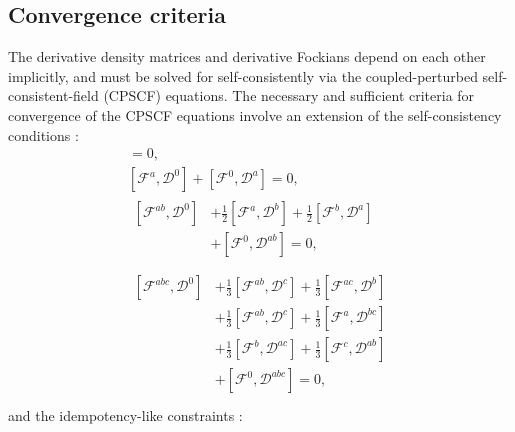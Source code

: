 \documentclass[prl,aps,letterpaper,twocolumn,showpacs,twocolumngrid,superbib]{revtex4}
\def\F{\mathcal{F}}
\def\D{\mathcal{D}}
\begin{document}
\subsection{Convergence criteria}

The derivative density matrices and derivative Fockians depend on 
each other implicitly, and must be solved for self-consistently
via the coupled-perturbed self-consistent-field (CPSCF) equations.
The necessary and sufficient criteria for convergence of the 
CPSCF equations involve an extension of the self-consistency conditions \cite{Furche_2001}:
\begin{gather}
    [\F^{0} ,\D^{0}]=0,\label{eq:commutators1}\\
    [\F^{a} ,\D^{0}]+[\F^{0},\D^{a}]=0,\label{eq:commutators2}\\
  \begin{split}
    [\F^{ab},\D^{0}]&+\frac{1}{2}[\F^{a},\D^{b}]+\frac{1}{2}[\F^{b},\D^{a}] \\
    &+[\F^{0},\D^{ab}]=0,\label{eq:commutators3}\\
  \end{split}\\
  \begin{split}
    [\F^{abc},\D^{0}]&+\frac{1}{3}[\F^{ab},\D^{c}]+\frac{1}{3}[\F^{ac},\D^{b}]\\
    &+\frac{1}{3}[\F^{ab},\D^{c}]+\frac{1}{3}[\F^{a},\D^{bc}]\\
    &+\frac{1}{3}[\F^{b},\D^{ac}]+\frac{1}{3}[\F^{c},\D^{ab}]\\
    &+[\F^{0},\D^{abc}]=0,\label{eq:commutators4}\\
  \end{split}
\end{gather}
and the idempotency-like constraints \cite{Furche_2001}:
\end{document}
